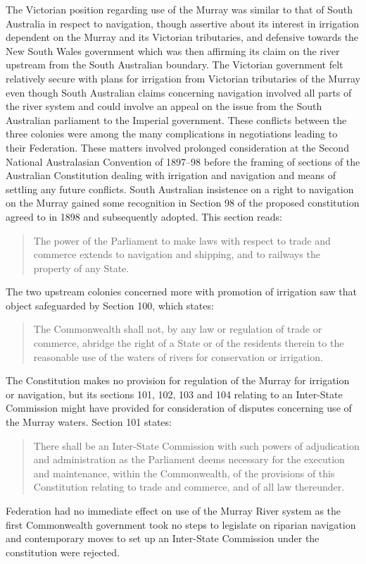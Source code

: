 The Victorian position regarding use of the Murray was similar to that
of South Australia in respect to navigation, though assertive about
its interest in irrigation dependent on the Murray and its Victorian
tributaries, and defensive towards the New South Wales government
which was then affirming its claim on the river upstream from the
South Australian boundary.  The Victorian government felt relatively
secure with plans for irrigation from Victorian tributaries of the
Murray even though South Australian claims concerning navigation
involved all parts of the river system and could involve an appeal on
the issue from the South Australian parliament to the Imperial
government.  These conflicts between the three colonies were among the
many complications in negotiations leading to their Federation.  These
matters involved prolonged consideration at the Second National
Australasian Convention of 1897--98 before the framing of sections of
the Australian Constitution dealing with irrigation and navigation and
means of settling any future conflicts.  South Australian insistence
on a right to navigation on the Murray gained some recognition in
Section 98 of the proposed constitution agreed to in 1898 and
subsequently adopted.  This
section reads:
\begin{quote}
	The power of the Parliament to make laws with respect to trade
	and commerce extends to navigation and shipping, and to
	railways the property of any State.
\end{quote}

The two upstream colonies concerned more with promotion of irrigation
saw that object safeguarded by Section 100, which states:
\begin{quote}
	The Commonwealth shall not, by any law or regulation of trade
	or commerce, abridge the right of a State or of the residents
	therein to the reasonable use of the waters of rivers for
	conservation or irrigation.
\end{quote}

The Constitution makes no provision for regulation of the Murray for
irrigation or navigation, but its sections 101, 102, 103 and 104
relating to an Inter-State Commission might have provided for
consideration of disputes concerning use of the Murray waters.
Section 101 states:
\begin{quote}
	There shall be an Inter-State Commission with such powers of
	adjudication and administration as the Parliament deems
	necessary for the execution and maintenance, within the
	Commonwealth, of the provisions of this Constitution relating
	to trade and commerce, and of all law thereunder.
\end{quote}
Federation had no immediate effect on use of the Murray River system
as the first Commonwealth government took no steps to legislate on
riparian navigation and contemporary moves to set up an Inter-State
Commission under the constitution were
rejected.

